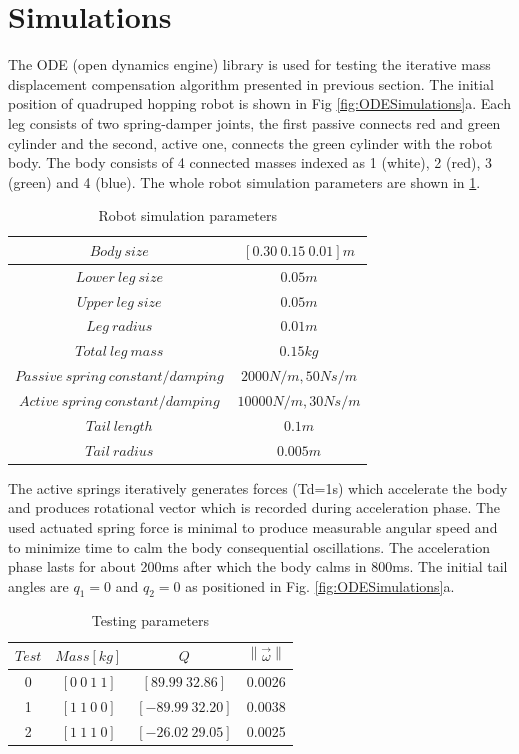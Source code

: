 \section{Simulations}\label{sec:simulation}

The ODE (open dynamics engine) library \cite{ode:2008} is used for testing the iterative mass displacement compensation algorithm presented in previous section. The initial position of quadruped hopping robot is shown in Fig \ref{fig:ODESimulations}a. Each leg consists of two spring-damper joints, the first passive connects red and green cylinder and the second, active one, connects the green cylinder with the robot body. The body consists of 4 connected masses indexed as 1 (white), 2 (red), 3 (green) and 4 (blue). The whole robot simulation parameters are shown in \ref{tab:RobotDimensions}.

\begin{table}
\centering
\begin{tabular}{|c|c|}
	\hline
	$Body\: size$ &  $[0.30\: 0.15\: 0.01]m$ \\
	\hline
	$Lower\:leg\:size$ &  $0.05m$ \\
	\hline
	$Upper\:leg\:size$ &  $0.05m$ \\
	\hline
	$Leg\:radius$ &  $0.01m$ \\
	\hline
	$Total\:leg\:mass$ &  $0.15kg$ \\
	\hline
	$Passive\:spring\:constant/damping$ &  $2000N/m, 50Ns/m$ \\
	\hline
	$Active\:spring\:constant/damping$ &  $10000N/m, 30Ns/m$ \\
	\hline
	$Tail\:length$ &  $0.1m$ \\
	\hline
	$Tail\:radius$ &  $0.005m$ \\
	\hline
\end{tabular}
\caption{Robot simulation parameters}\label{tab:RobotDimensions}
\end{table}



The active springs iteratively generates forces (Td=1s) which accelerate the body and produces rotational vector which is recorded during acceleration phase. The used actuated spring force is minimal to produce measurable angular speed and to minimize time to calm the body consequential oscillations. The acceleration phase lasts for about 200ms after which the body calms in 800ms. The initial tail angles are $q_1=0$ and $q_2=0$ as positioned in Fig. \ref{fig:ODESimulations}a.

\begin{table}
	\centering
\begin{tabular}{|c|c|c|c|}
	\hline
$Test$ &  $Mass[kg]$ & $Q$  & $\left \| \vec{\omega} \right \|$\\
	\hline
0   & $[0\: 0\: 1\: 1]$ & $[89.99\: 32.86]$ & 0.0026\\
1   & $[1\: 1\: 0\: 0]$ & $[-89.99\: 32.20]$ & 0.0038\\
2   & $[1\: 1\: 1\: 0]$ & $[-26.02\: 29.05]$ &  0.0025\\
\hline
\end{tabular}
\caption{Testing parameters}\label{tab:Simulations}
\end{table}



